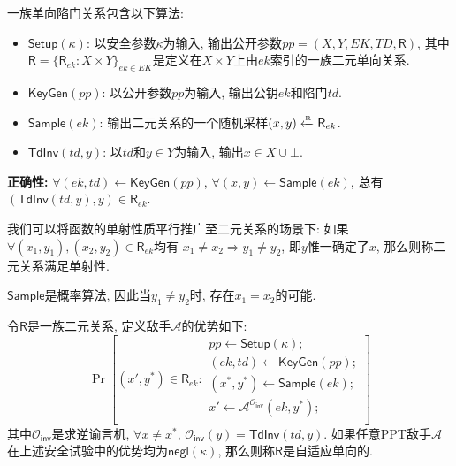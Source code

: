 \begin{definition}[单向陷门关系]
一族单向陷门关系包含以下算法:  
\begin{itemize}
	\item $\mathsf{Setup}(\kappa)$: 以安全参数$\kappa$为输入, 输出公开参数$pp = (X, Y, EK, TD, \mathsf{R})$, 
		其中$\mathsf{R} = \{\mathsf{R}_{ek}: X \times Y\}_{ek \in EK}$是定义在$X \times Y$上由$ek$索引的一族二元单向关系.  
    
    \item $\mathsf{KeyGen}(pp)$: 以公开参数$pp$为输入, 输出公钥$ek$和陷门$td$. 

    \item $\mathsf{Sample}(ek)$: 输出二元关系的一个随机采样$(x, y) \xleftarrow{\textup{\tiny R}} \mathsf{R}_{ek}$. 


    \item $\mathsf{TdInv}(td, y)$: 以$td$和$y \in Y$为输入, 输出$x \in X \cup \bot$. 
\end{itemize}
\end{definition}

\begin{trivlist}
\item \textbf{正确性:} $\forall (ek, td) \leftarrow \mathsf{KeyGen}(pp)$, $\forall (x, y) \leftarrow \mathsf{Sample}(ek)$, 
	总有$(\mathsf{TdInv}(td, y), y) \in \mathsf{R}_{ek}$. 
\end{trivlist}

我们可以将函数的单射性质平行推广至二元关系的场景下: 如果$\forall (x_1, y_1), (x_2, y_2) \in \mathsf{R}_{ek}$均有
$x_1 \neq x_2 \Rightarrow y_1 \neq y_2$, 即$y$惟一确定了$x$, 那么则称二元关系满足单射性. 
\begin{note}
$\mathsf{Sample}$是概率算法, 因此当$y_1 \neq y_2$时, 存在$x_1 = x_2$的可能.  
\end{note}

\begin{definition}[自适应单向性]
令$\mathsf{R}$是一族二元关系, 定义敌手$\mathcal{A}$的优势如下: 
\begin{displaymath}
\Pr \left[
(x', y^*) \in \mathsf{R}_{ek}: 
\begin{array}{l}
	pp \leftarrow \mathsf{Setup}(\kappa);\\ 
    (ek, td) \leftarrow \mathsf{KeyGen}(pp);\\
    (x^*, y^*) \leftarrow \mathsf{Sample}(ek);\\
    x' \leftarrow \mathcal{A}^{\mathcal{O}_\mathsf{inv}}(ek, y^*);\\
\end{array} 
\right]
\end{displaymath}
其中$\mathcal{O}_\mathsf{inv}$是求逆谕言机, $\forall x \neq x^*$, $\mathcal{O}_\mathsf{inv}(y) = \mathsf{TdInv}(td, y)$. 
如果任意PPT敌手$\mathcal{A}$在上述安全试验中的优势均为$\mathsf{negl}(\kappa)$, 
那么则称$\mathsf{R}$是自适应单向的.  
\end{definition}


